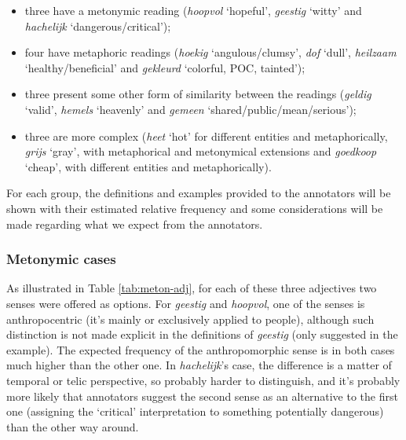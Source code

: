 \documentclass[
]{book}
\begin{document}
\begin{itemize}
\item
  three have a metonymic reading (\emph{hoopvol} `hopeful', \emph{geestig} `witty' and \emph{hachelijk} `dangerous/critical');
\item
  four have metaphoric readings (\emph{hoekig} `angulous/clumsy', \emph{dof} `dull', \emph{heilzaam} `healthy/beneficial' and \emph{gekleurd} `colorful, POC, tainted');
\item
  three present some other form of similarity between the readings (\emph{geldig} `valid', \emph{hemels} `heavenly' and \emph{gemeen} `shared/public/mean/serious');
\item
  three are more complex (\emph{heet} `hot' for different entities and metaphorically, \emph{grijs} `gray', with metaphorical and metonymical extensions and \emph{goedkoop} `cheap', with different entities and metaphorically).
\end{itemize}

For each group, the definitions and examples provided to the annotators will be shown with their estimated relative frequency and some considerations will be made regarding what we expect from the annotators.

\hypertarget{metonymic-cases}{%
\subsubsection{Metonymic cases}\label{metonymic-cases}}

As illustrated in Table \ref{tab:meton-adj}, for each of these three adjectives two senses were offered as options. For \emph{geestig} and \emph{hoopvol}, one of the senses is anthropocentric (it's mainly or exclusively applied to people), although such distinction is not made explicit in the definitions of \emph{geestig} (only suggested in the example). The expected frequency of the anthropomorphic sense is in both cases much higher than the other one. In \emph{hachelijk}'s case, the difference is a matter of temporal or telic perspective, so probably harder to distinguish, and it's probably more likely that annotators suggest the second sense as an alternative to the first one (assigning the `critical' interpretation to something potentially dangerous) than the other way around.

\providecommand{\docline}[3]{\noalign{\global\setlength{\arrayrulewidth}{#1}}\arrayrulecolor[HTML]{#2}\cline{#3}}

\setlength{\tabcolsep}{2pt}
\end{document}
